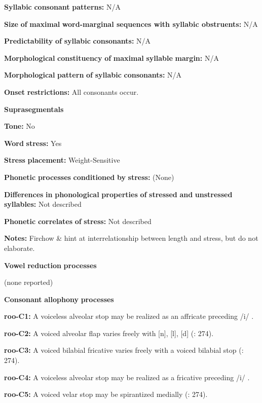 \textbf{Syllabic} \textbf{consonant} \textbf{patterns:} N/A

\textbf{Size} \textbf{of} \textbf{maximal} \textbf{word{}-marginal sequences with syllabic obstruents:} N/A

\textbf{Predictability} \textbf{of} \textbf{syllabic} \textbf{consonants:} N/A

\textbf{Morphological} \textbf{constituency} \textbf{of} \textbf{maximal} \textbf{syllable} \textbf{margin:} N/A

\textbf{Morphological} \textbf{pattern} \textbf{of} \textbf{syllabic} \textbf{consonants:} N/A

\textbf{Onset} \textbf{restrictions:} All consonants occur.

\textbf{Suprasegmentals}

\textbf{Tone:} No

\textbf{Word} \textbf{stress:} Yes

\textbf{Stress} \textbf{placement:} Weight-Sensitive

\textbf{Phonetic} \textbf{processes} \textbf{conditioned} \textbf{by} \textbf{stress:} (None)

\textbf{Differences} \textbf{in} \textbf{phonological} \textbf{properties} \textbf{of} \textbf{stressed} \textbf{and} \textbf{unstressed} \textbf{syllables:} Not described

\textbf{Phonetic} \textbf{correlates} \textbf{of} \textbf{stress:} Not described

\textbf{Notes:} Firchow \& \citet[271]{Firchow1969} hint at interrelationship between length and stress, but do not elaborate.

\textbf{Vowel} \textbf{reduction} \textbf{processes}

(none reported)

\textbf{Consonant} \textbf{allophony} \textbf{processes}

\textbf{roo-C1:} A voiceless alveolar stop may be realized as an affricate preceding /i/ \citep[28]{Robinson2011}.

\textbf{roo-C2:} A voiced alveolar flap varies freely with [n], [l], [d] (\citealt{FirchowFirchow1969}: 274).

\textbf{roo-C3:} A voiced bilabial fricative varies freely with a voiced bilabial stop (\citealt{FirchowFirchow1969}: 274).

\textbf{roo-C4:} A voiceless alveolar stop may be realized as a fricative preceding /i/ \citep[28]{Robinson2011}.

\textbf{roo-C5:} A voiced velar stop may be spirantized medially (\citealt{FirchowFirchow1969}: 274).

